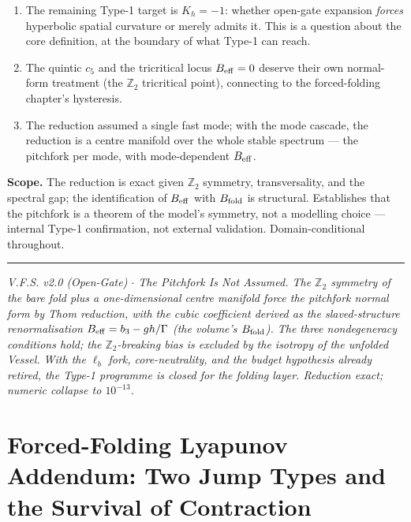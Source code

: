 \documentclass[11pt,a4paper,oneside]{book}
\newcommand{\Bfold}{B_{\rm fold}}
\newcommand{\Beff}{B_{\rm eff}}
\theoremstyle{plain}
\theoremstyle{definition}
\theoremstyle{remark}
\begin{document}
\begin{enumerate}[leftmargin=1.6em,itemsep=2pt]
\item The remaining Type-1 target is $K_h=-1$: whether open-gate expansion \emph{forces} hyperbolic
spatial curvature or merely admits it. This is a question about the core definition, at the boundary
of what Type-1 can reach.
\item The quintic $c_5$ and the tricritical locus $\Beff=0$ deserve their own normal-form treatment
(the $\mathbb Z_2$ tricritical point), connecting to the forced-folding chapter's hysteresis.
\item The reduction assumed a single fast mode; with the mode cascade, the reduction is a centre
manifold over the whole stable spectrum --- the pitchfork per mode, with mode-dependent $\Beff$.
\end{enumerate}

\textbf{Scope.} The reduction is exact given $\mathbb Z_2$ symmetry, transversality, and the spectral
gap; the identification of $\Beff$ with $\Bfold$ is structural. Establishes that the pitchfork is a
theorem of the model's symmetry, not a modelling choice --- internal Type-1 confirmation, not external
validation. Domain-conditional throughout.

\vspace{0.5em}
\hrule
\smallskip
\noindent\footnotesize\emph{V.F.S. v2.0 (Open-Gate) $\cdot$ The Pitchfork Is Not Assumed. The
$\mathbb Z_2$ symmetry of the bare fold plus a one-dimensional centre manifold force the pitchfork
normal form by Thom reduction, with the cubic coefficient derived as the slaved-structure
renormalisation $\Beff=b_3-gh/\Gamma$ (the volume's $\Bfold$). The three nondegeneracy conditions
hold; the $\mathbb Z_2$-breaking bias is excluded by the isotropy of the unfolded Vessel. With the
$\ell_b$ fork, core-neutrality, and the budget hypothesis already retired, the Type-1 programme is
closed for the folding layer. Reduction exact; numeric collapse to $10^{-13}$.}

\chapter{Forced-Folding Lyapunov Addendum: Two Jump Types and the Survival of Contraction}
\end{document}
